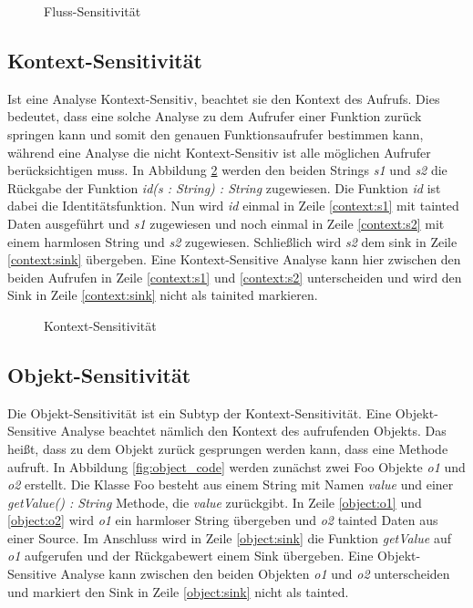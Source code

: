 \documentclass[runningheads]{llncs}
\begin{document}
\begin{figure}

\caption{Fluss-Sensitivität}
\label{fig:fluss_code}
\end{figure}

\subsection{Kontext-Sensitivität}
Ist eine Analyse Kontext-Sensitiv, beachtet sie den Kontext des Aufrufs. Dies bedeutet, dass eine solche Analyse zu dem Aufrufer einer Funktion zurück springen kann und somit den genauen Funktionsaufrufer bestimmen kann, während eine Analyse die nicht Kontext-Sensitiv ist alle möglichen Aufrufer berücksichtigen muss.
In Abbildung \ref{fig:context_code} werden den beiden Strings \emph{s1} und \emph{s2} die Rückgabe der Funktion \emph{id(s : String) : String} zugewiesen. Die Funktion \emph{id} ist dabei die Identitätsfunktion. Nun wird \emph{id} einmal in Zeile \ref{context:s1} mit tainted Daten ausgeführt und \emph{s1} zugewiesen und noch einmal in Zeile \ref{context:s2} mit einem harmlosen String und \emph{s2} zugewiesen. Schließlich wird \emph{s2} dem sink in Zeile \ref{context:sink} übergeben. Eine Kontext-Sensitive Analyse kann hier zwischen den beiden Aufrufen in Zeile \ref{context:s1} und \ref{context:s2} unterscheiden und wird den Sink in Zeile \ref{context:sink} nicht als tainited markieren.
 
\begin{figure}

\caption{Kontext-Sensitivität}
\label{fig:context_code}
\end{figure}

\subsection{Objekt-Sensitivität}
Die Objekt-Sensitivität ist ein Subtyp der Kontext-Sensitivität. Eine Objekt-Sensitive Analyse beachtet nämlich den Kontext des aufrufenden Objekts. Das heißt, dass zu dem Objekt zurück gesprungen werden kann, dass eine Methode aufruft.
In Abbildung \ref{fig:object_code} werden zunächst zwei Foo Objekte \emph{o1} und \emph{o2} erstellt. Die Klasse Foo  besteht aus einem String mit Namen \emph{value} und einer \emph{getValue() : String} Methode, die \emph{value} zurückgibt. In Zeile \ref{object:o1} und \ref{object:o2} wird \emph{o1} ein harmloser String übergeben und \emph{o2} tainted Daten aus einer Source. Im Anschluss wird in Zeile \ref{object:sink} die Funktion \emph{getValue} auf \emph{o1} aufgerufen und der Rückgabewert einem Sink übergeben. Eine Objekt-Sensitive Analyse kann zwischen den beiden Objekten \emph{o1} und \emph{o2} unterscheiden und markiert den Sink in Zeile \ref{object:sink} nicht als tainted. 
\end{document}

